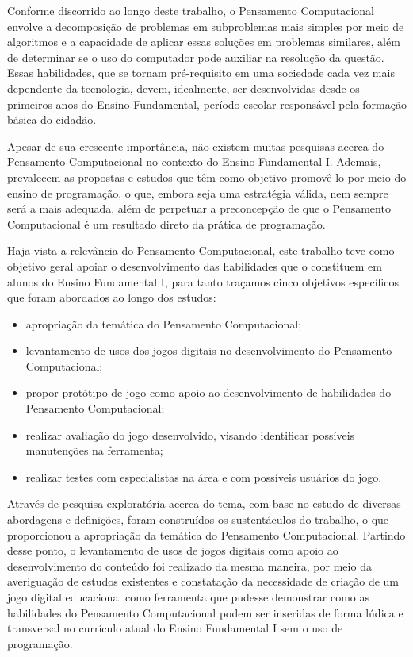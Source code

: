 Conforme discorrido ao longo deste trabalho, o Pensamento Computacional envolve a decomposição de problemas em subproblemas mais simples por meio de algoritmos e a capacidade de aplicar essas soluções em problemas similares, além de determinar se o uso do computador pode auxiliar na resolução da questão. Essas habilidades, que se tornam pré-requisito em uma sociedade cada vez mais dependente da tecnologia, devem, idealmente, ser desenvolvidas desde os primeiros anos do Ensino Fundamental, período escolar responsável pela formação básica do cidadão. 

Apesar de sua crescente importância, não existem muitas pesquisas acerca do Pensamento Computacional no contexto do Ensino Fundamental I. Ademais, prevalecem as propostas e estudos que têm como objetivo promovê-lo por meio do ensino de programação, o que, embora seja uma estratégia válida, nem sempre será a mais adequada, além de perpetuar a preconcepção de que o Pensamento Computacional é um resultado direto da prática de programação. 

Haja vista a relevância do Pensamento Computacional, este trabalho teve como objetivo geral apoiar o desenvolvimento das habilidades que o constituem em alunos do Ensino Fundamental I, para tanto traçamos cinco objetivos específicos que foram abordados ao longo dos estudos: 

\begin{itemize}
	\item apropriação da temática do Pensamento Computacional;
	\item levantamento de usos dos jogos digitais no desenvolvimento do Pensamento Computacional;
	\item propor protótipo de jogo como apoio ao desenvolvimento de habilidades do Pensamento Computacional;
	\item realizar avaliação do jogo desenvolvido, visando identificar possíveis manutenções na ferramenta;
	\item realizar testes com especialistas na área e com possíveis usuários do jogo.
\end{itemize}

Através de pesquisa exploratória acerca do tema, com base no estudo de diversas abordagens e definições, foram construídos os sustentáculos do trabalho, o que proporcionou a apropriação da temática do Pensamento Computacional. Partindo desse ponto, o levantamento de usos de jogos digitais como apoio ao desenvolvimento do conteúdo foi realizado da mesma maneira, por meio da averiguação de estudos existentes e constatação da necessidade de criação de um jogo digital educacional como ferramenta que pudesse demonstrar como as habilidades do Pensamento Computacional podem ser inseridas de forma lúdica e transversal no currículo atual do Ensino Fundamental I sem o uso de programação. 
 
